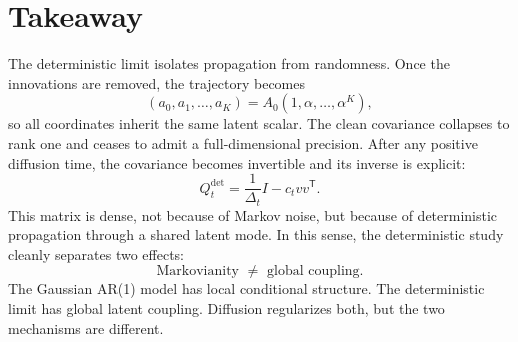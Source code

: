 \documentclass[11pt]{article}
\newcommand{\Id}{I}
\newcommand{\trans}{\mathsf{T}}
\begin{document}
\section{Takeaway}
The deterministic limit isolates propagation from randomness. Once the innovations are removed, the trajectory becomes
\[
(a_0,a_1,\dots,a_K)=A_0(1,\alpha,\dots,\alpha^K),
\]
so all coordinates inherit the same latent scalar. The clean covariance collapses to rank one and ceases to admit a full-dimensional precision. After any positive diffusion time, the covariance becomes invertible and its inverse is explicit:
\[
Q_t^{\mathrm{det}}=\frac{1}{\Delta_t}\Id-c_t vv^\trans.
\]
This matrix is dense, not because of Markov noise, but because of deterministic propagation through a shared latent mode. In this sense, the deterministic study cleanly separates two effects:
\[
\text{Markovianity }\neq\text{ global coupling}.
\]
The Gaussian AR(1) model has local conditional structure. The deterministic limit has global latent coupling. Diffusion regularizes both, but the two mechanisms are different.
\end{document}
